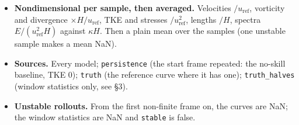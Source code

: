 \documentclass[10pt]{article}
\newcommand{\uref}{u_\mathrm{ref}}
\newcommand{\Tbar}{\bar{T}}
\begin{document}
\begin{itemize}
\begin{itemize}
    $z_c = (k_c + \tfrac12)\Delta z$ (so $z_c/H$ varies by sample). Spectra,
    $\Lambda_y$, PDFs and $W_2$ are taken there.
    $k_p$ = \texttt{metrics.pedestrian\_level} (default 0).
  \item $\uref$: the plane mean of $\bar{u}_u$ at $k_c$ (all cells fluid).
  \item $T$: integral time scale of the truth. Per fluid cell and component,
    $x_t = u_c - \bar{u}_c$, $R(\tau) = \sum_t x_t x_{t+\tau} / \sum_t x_t^2$
    (biased, not re-centred),
    $T_\text{cell} = \Delta t\,\bigl(\sum_{\tau=0}^{\tau_0-1} R(\tau) - \tfrac12\bigr)$
    with $\tau_0$ the first lag where $R \le 0$ (all lags if none): the
    trapezoid rule for $\int_0^{\tau_0\Delta t} R\,dt$ with $R(\tau_0)$ taken as 0. $T$ = mean over
    cells and components; $\Delta t$ the mean output interval.
    $\Tbar$ = mean of $T$ over the samples; lead time is shown as $t/\Tbar$
    (\texttt{lead\_over\_T}); likewise $\bar H$ for $z/\bar H$.
  \end{itemize}
\item \textbf{Nondimensional per sample, then averaged.} Velocities $/\uref$,
  vorticity and divergence $\times H/\uref$, TKE and stresses $/\uref^2$,
  lengths $/H$, spectra $E/(\uref^2 H)$ against $\kappa H$. Then a plain mean
  over the samples (one unstable sample makes a mean NaN).
\item \textbf{Sources.} Every model; \texttt{persistence} (the start frame
  repeated: the no-skill baseline, TKE 0); \texttt{truth} (the reference curve
  where it has one); \texttt{truth\_halves} (window statistics only, see \S3).
\item \textbf{Unstable rollouts.} From the first non-finite frame on, the
  curves are NaN; the window statistics are NaN and \texttt{stable} is false.
\end{itemize}
\end{document}
